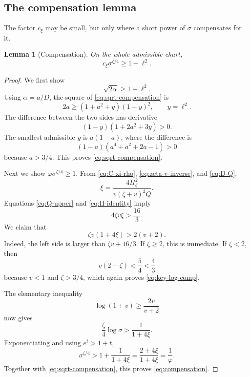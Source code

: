 \documentclass[11pt]{article}
\newtheorem{lemma}[theorem]{Lemma}
\begin{document}
\subsection{The compensation lemma}

The factor \(c_\xi\) may be small, but only where a short power of
\(\sigma\) compensates for it.

\begin{lemma}[Compensation]\label{lem:compensation}
On the whole admissible chart,
\begin{equation}\label{eq:compensation}
       c_\xi\sigma^{\zeta/4}\ge1-\ell^2.
\end{equation}
\end{lemma}

\begin{proof}
We first show
\begin{equation}\label{eq:sqrt-compensation}
       \sqrt{2\alpha}\ge1-\ell^2.
\end{equation}
Using \(\alpha=a/D\), the square of \eqref{eq:sqrt-compensation} is
\[
       2a\ge(1+a^2+y)(1-y)^2,
       \qquad y=\ell^2.
\]
The difference between the two sides has derivative
\[
       (1-y)(1+2a^2+3y)>0.
\]
The smallest admissible \(y\) is \(a(1-a)\), where the difference is
\[
       (1-a)(a^4+a^2+2a-1)>0
\]
because \(a>3/4\).  This proves \eqref{eq:sqrt-compensation}.

Next we show \(\varphi\sigma^{\zeta/4}\ge1\).  From
\eqref{eq:C-xi-rho}, \eqref{eq:zeta-v-inverse}, and
\eqref{eq:D-Q},
\begin{equation}\label{eq:xi-zeta-v}
       \xi=\frac{4H_\zeta^2}
       {v(\zeta+v)^2Q}.
\end{equation}
Equations \eqref{eq:Q-upper} and \eqref{eq:H-identity} imply
\begin{equation}\label{eq:xi-comp-bound}
       4\zeta v\xi>\frac{16}{3}.
\end{equation}
We claim that
\begin{equation}\label{eq:key-log-comp}
       \zeta v(1+4\xi)>2(v+2).
\end{equation}
Indeed, the left side is larger than \(\zeta v+16/3\).  If
\(\zeta\ge2\), this is immediate.  If \(\zeta<2\), then
\[
       v(2-\zeta)<\frac54<\frac43
\]
because \(v<1\) and \(\zeta>3/4\), which again proves
\eqref{eq:key-log-comp}.

The elementary inequality
\[
       \log(1+v)\ge\frac{2v}{v+2}
\]
now gives
\[
       \frac\zeta4\log\sigma>
       \frac1{1+4\xi}.
\]
Exponentiating and using \(e^t>1+t\),
\[
       \sigma^{\zeta/4}>
       1+\frac1{1+4\xi}
       =\frac{2+4\xi}{1+4\xi}=\frac1\varphi.
\]
Together with \eqref{eq:sqrt-compensation}, this proves
\eqref{eq:compensation}.
\end{proof}
\end{document}
